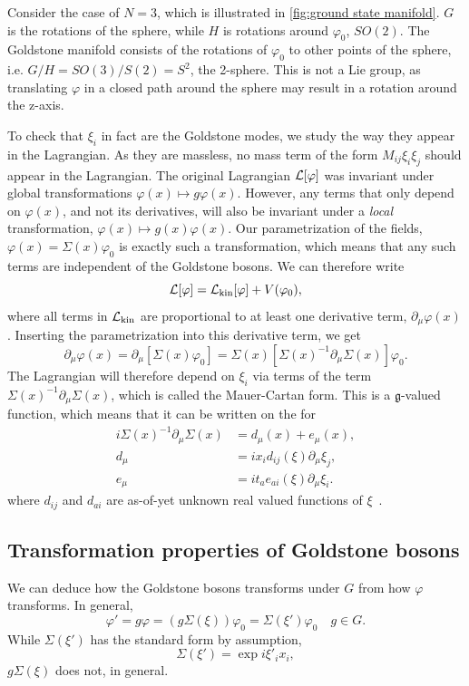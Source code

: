 Consider the case of $N = 3$, which is illustrated in \autoref{fig:ground state manifold}.
$G$ is the rotations of the sphere, while $H$ is rotations around $\varphi_0$, $SO(2)$.
The Goldstone manifold consists of the rotations of $\varphi_0$ to other points of the sphere, i.e. $G/H = SO(3)/S(2) = S^2$, the 2-sphere.
This is not a Lie group, as translating $\varphi$ in a closed path around the sphere may result in a rotation around the z-axis.


To check that $\xi_i$ in fact are the Goldstone modes, we study the way they appear in the Lagrangian.
As they are massless, no mass term of the form $M_{ij} \xi_i \xi_j$ should appear in the Lagrangian.
The original Lagrangian $\mathcal{L}[\varphi]$ was invariant under global transformations $\varphi(x) \mapsto g \varphi(x)$.
However, any terms that only depend on $\varphi(x)$, and not its derivatives, will also be invariant under a \emph{local} transformation, $\varphi(x) \mapsto g(x)\varphi(x)$.
Our parametrization of the fields, $\varphi(x) = \Sigma(x)\varphi_0$ is exactly such a transformation, which means that any such terms are independent of the Goldstone bosons.
We can therefore write
\begin{equation}
    \mathcal{L}[\varphi] = \mathcal{L}_{\mathrm{kin}}[\varphi] + V(\varphi_0),
\end{equation}
where all terms in $\mathcal{L}_{\mathrm{kin}}$ are proportional to at least one derivative term, $\partial_\mu \varphi(x)$.
Inserting the parametrization into this derivative term, we get
\begin{equation}
    \partial_\mu \varphi(x) = \partial_\mu [\Sigma(x) \varphi_0]
    = \Sigma(x) [\Sigma(x)^{-1} \partial_{\mu} \Sigma(x)] \varphi_0.
\end{equation}
The Lagrangian will therefore depend on $\xi_i$ via terms of the term $\Sigma(x)^{-1}\partial_\mu \Sigma(x)$, which is called the Mauer-Cartan form.
This is a $\mathfrak g$-valued function, which means that it can be written on the for
\begin{align*}
    i\Sigma(x)^{-1}\partial_\mu \Sigma(x) & 
    = d_{\mu}(x) + e_{\mu}(x), \\
    d_{\mu} & = i x_i d_{ij}(\xi) \partial_\mu \xi_j, \\
    e_{\mu} & = i t_a e_{ai}(\xi)\partial_\mu \xi_i.
\end{align*}
where $d_{ij}$ and $d_{ai}$ are as-of-yet unknown real valued functions of $\xi$~\cite{weinberg_1996_vol2,Watanabe:effective_lagrangian}.

\subsection*{Transformation properties of Goldstone bosons}
We can deduce how the Goldstone bosons transforms under $G$ from how $\varphi$ transforms.
In general, 
\begin{equation}
    \varphi' = g \varphi = (g \Sigma(\xi)) \varphi_0 = \Sigma(\xi') \varphi_0 \quad g \in G.
\end{equation}
While $\Sigma(\xi')$ has the standard form by assumption,
\begin{equation}
    \Sigma(\xi') = \exp{i \xi'_i x_i},
\end{equation}
$g\Sigma(\xi)$ does not, in general.

